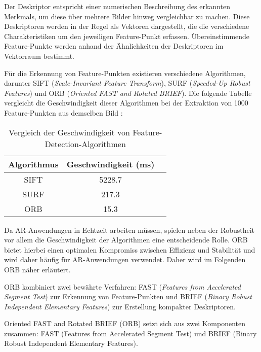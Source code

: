 Der Deskriptor entspricht einer numerischen Beschreibung des erkannten Merkmals, um diese über mehrere Bilder hinweg vergleichbar zu machen. Diese Deskriptoren werden in der Regel als Vektoren dargestellt, die die verschiedene Charakteristiken um den jeweiligen Feature-Punkt erfassen. Übereinstimmende Feature-Punkte werden anhand der Ähnlichkeiten der Deskriptoren im Vektorraum bestimmt. \cite{gao2021vSLAM, szeliski2022computerVision}

Für die Erkennung von Feature-Punkten existieren verschiedene Algorithmen, darunter SIFT (\emph{Scale-Invariant Feature Transform}), SURF (\emph{Speeded-Up Robust Features}) und ORB (\emph{Oriented FAST and Rotated BRIEF}). Die folgende Tabelle vergleicht die Geschwindigkeit dieser Algorithmen bei der Extraktion von 1000 Feature-Punkten aus demselben Bild \cite{gao2021vSLAM}:

\begin{table}[h]
    \centering
    \begin{tabular}{ccl} 
        \hline
        Algorithmus & Geschwindigkeit (ms) \\ 
        \hline
        SIFT & 5228.7 \\ 
        SURF & 217.3 \\ 
        ORB & 15.3 \\ 
        \hline
    \end{tabular}
    \caption{Vergleich der Geschwindigkeit von Feature-Detection-Algorithmen \cite{gao2021vSLAM}}
    \label{tab:AlgorithmComparison}
\end{table}

Da AR-Anwendungen in Echtzeit arbeiten müssen, spielen neben der Robustheit vor allem die Geschwindigkeit der Algorithmen eine entscheidende Rolle. ORB bietet hierbei einen optimalen Kompromiss zwischen Effizienz und Stabilität und wird daher häufig für AR-Anwendungen verwendet. Daher wird im Folgenden ORB näher erläutert. \cite{gao2021vSLAM, rublee2011orb}

ORB kombiniert zwei bewährte Verfahren: FAST (\emph{Features from Accelerated Segment Test}) zur Erkennung von Feature-Punkten und BRIEF (\emph{Binary Robust Independent Elementary Features}) zur Erstellung kompakter Deskriptoren. \cite{gao2021vSLAM, rublee2011orb}



Oriented FAST and Rotated BRIEF (ORB) setzt sich aus zwei Komponenten zusammen: FAST (Features from Accelerated Segment Test) und BRIEF (Binary Robust Independent Elementary Features).  \cite{gao2021vSLAM, rublee2011orb}

